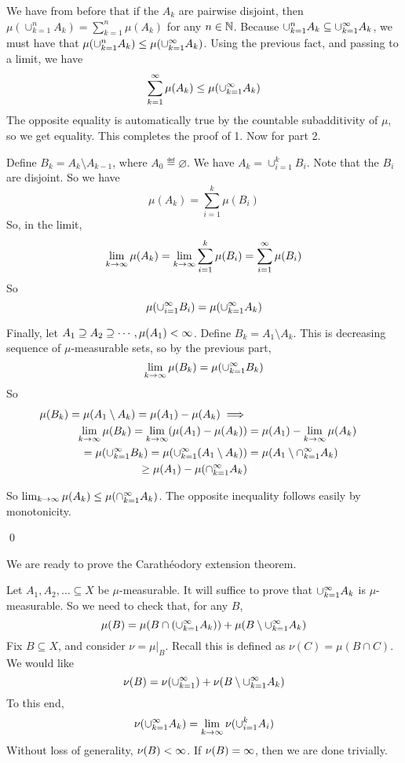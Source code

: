 \documentclass[x11names,reqno,14pt]{extarticle}
\newcommand{\seq}[1]{_{#1 = 1}^\oo}
\begin{document}
\proof

We have from before that if the $A_k$ are pairwise disjoint, then $\mu(\cup_{k=1}^nA_k) = \sum_{k=1}^n\mu(A_k)$ for any $n \in \mathbb{N}$. Because $\cup_{k=1}^nA_k \subseteq \cup\seq{k}A_k$, we must have that $\mu(\cup_{k=1}^nA_k) \leq \mu(\cup\seq{k}A_k)$. Using the previous fact, and passing to a limit, we have
\[
\sum\seq{k}\mu(A_k) \leq \mu(\cup\seq{k}A_k)
\]
The opposite equality is automatically true by the countable subadditivity of $\mu$, so we get equality. This completes the proof of 1. Now for part 2. 

Define $B_k = A_k \setminus A_{k - 1}$, where $A_0 \eqdef \varnothing$. We have $A_k = \cup_{i=1}^kB_i$. Note that the $B_i$ are disjoint. So we have
\[
\mu(A_k) = \sum_{i=1}^k\mu(B_i)
\]
So, in the limit, 
\[
\lim_{k\to\oo}\mu(A_k) = \lim_{k\to\oo}\sum_{i=1}^k\mu(B_i) = \sum\seq{i}\mu(B_i)
\]
So
\[
\mu(\cup\seq{i}B_i) = \mu(\cup\seq{k}A_k)
\]

Finally, let $A_1 \supseteq A_2 \supseteq \cdots, \mu(A_1)<\infty$. Define $B_k = A_1\setminus A_k$. This is decreasing sequence of $\mu$-measurable sets, so by the previous part, 
\[
\lim_{k\to\oo}\mu(B_k) = \mu(\cup\seq{k}B_k)
\]
So
\begin{align*}
\mu(B_k) = \mu(A_1\setminus A_k)  = \mu(A_1) - \mu(A_k) \implies \\
\lim_{k\to\oo}\mu(B_k) = \lim_{k\to\oo}(\mu(A_1) - \mu(A_k)) & = \mu(A_1) - \lim_{k\to\oo}\mu(A_k) \\
= \mu(\cup\seq{k}B_k) = \mu(\cup\seq{k}(A_1 \setminus A_k)) & = \mu(A_1 \setminus \cap\seq{k} A_k) \\
\geq \mu(A_1) - \mu(\cap\seq{k}A_k) & \\
\end{align*}

So $\lim_{k\to\oo}\mu(A_k) \leq \mu(\cap\seq{k}A_k)$. The opposite inequality follows easily by monotonicity. 

\qed

We are ready to prove the Carath\'eodory extension theorem. 

\proof

Let $A_1, A_2, \dots \subseteq X$ be $\mu$-measurable. It will suffice to prove that $\cup\seq{k}A_k$ is $\mu$-measurable. So we need to check that, for any $B$, 
\[
\mu(B) = \mu(B\cap (\cup\seq{k}A_k)) + \mu(B \setminus \cup\seq{k}A_k)
\]
Fix $B \subseteq X$, and consider $\nu = \mu|_B$. Recall this is defined as $\nu(C) = \mu(B \cap C)$. We would like 
\[
\nu(B) = \nu(\cup\seq{k}) + \nu(B \setminus \cup\seq{k}A_k)
\]
To this end, 
\begin{align*}
\nu(\cup\seq{k}A_k) & = \lim_{k\to\oo}\nu(\cup_{i=1}^kA_i) \\
\end{align*}
Without loss of generality, $\nu(B)<\infty$. If $\nu(B) = \infty$, then we are done trivially. 
\end{document}
